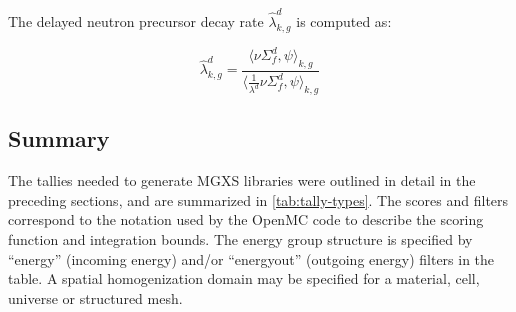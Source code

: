 The delayed neutron precursor decay rate $\hat{\lambda}_{k,g}^{d}$ is computed as:

\begin{equation}
\label{eqn:lambda}
\hat{\lambda}_{k,g}^{d} = \frac{\langle \nu \Sigma_f^d, \psi \rangle_{k,g}}{\Big\langle \frac{1}{\lambda^{d}} \nu \Sigma_f^d, \psi \Big\rangle_{k,g}}
\end{equation}

\subsection{Summary}
\label{subsec:tally-types-summary}

The tallies needed to generate MGXS libraries were outlined in detail in the preceding sections, and are summarized in \cref{tab:tally-types}. The scores and filters correspond to the notation used by the OpenMC code to describe the scoring function and integration bounds. The energy group structure is specified by ``energy'' (incoming energy) and/or ``energyout'' (outgoing energy) filters in the table. A spatial homogenization domain may be specified for a material, cell, universe or structured mesh.

